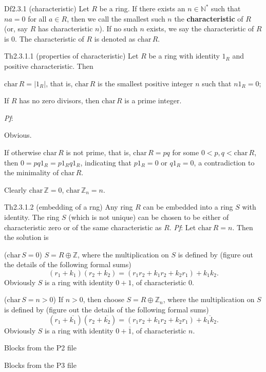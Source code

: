 \documentclass{article}
\newcommand{\Char}{\text{char}\,}
\begin{document}
\begin{Df}{Df2.3.1 (characteristic)}
    Let $R$ be a ring. If there exists an $n\in\mathbb{N}^\ast$ such that $na = 0$ for all $a \in R$, then we call the smallest such $n$ the \textbf{characteristic} of $R$ (or, say $R$ has characteristic $n$). If no such $n$ exists, we say the characteristic of $R$ is $0$. The characteristic of $R$ is denoted as $\Char R$.
\end{Df}

\begin{Th}{Th2.3.1.1 (properties of characteristic)}
    Let $R$ be a ring with identity $1_R$ and positive characteristic. Then
    \begin{compactenum}
        \item $\Char R = |1_R|$, that is, $\Char R$ is the smallest positive integer $n$ such that $n1_R = 0$;
        \item If $R$ has no zero divisors, then $\Char R$ is a prime integer.
    \end{compactenum}
    \tcblower
    \textit{Pf}: 
    \begin{compactenum}
        \item Obvious.
        \item If otherwise $\Char R$ is not prime, that is, $\Char R = pq$ for some $0 < p, q < \Char R$, then $0 = pq1_R = p1_R q1_R$, indicating that $p1_R = 0$ or $q1_R = 0$, a contradiction to the minimality of $\Char R$. 
    \end{compactenum}
\end{Th}

\begin{Rmk}{}
    \textcolor{Th}{Clearly $\Char\mathbb{Z} = 0$, $\Char\mathbb{Z}_n = n$.} 
\end{Rmk}

\begin{Th}{Th2.3.1.2 (embedding of a rng)}
    Any ring $R$ can be embedded into a ring $S$ with identity. The ring $S$ (which is not unique) can be chosen to be either of characteristic zero or of the same characteristic as $R$.
    \tcblower
    \textit{Pf}: Let $\Char R = n$. Then the solution is
    \begin{compactenum}
        \item ($\Char S = 0$) $S = R\oplus\mathbb{Z}$, where the multiplication on $S$ is defined by (figure out the details of the following formal sums)
        $$ (r_1+k_1)(r_2+k_2) = (r_1r_2 + k_1r_2 + k_2r_1) + k_1k_2. $$
        Obviously $S$ is a ring with identity $0+1$, of characteristic $0$.
        \item ($\Char S = n>0$) If $n>0$, then choose $S = R\oplus\mathbb{Z}_n$, where the multiplication on $S$ is defined by (figure out the details of the following formal sums)
        $$ (r_1+\overline{k_1})(r_2+\overline{k_2}) = (r_1r_2 + k_1r_2 + k_2r_1) + \overline{k_1k_2}. $$
        Obviously $S$ is a ring with identity $0+\overline{1}$, of characteristic $n$.
    \end{compactenum}
\end{Th}

\begin{Th}{Blocks from the P2 file}
\end{Th}

\begin{Th}{Blocks from the P3 file}
\end{Th}
\end{document}
